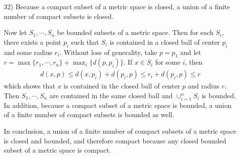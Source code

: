 \documentclass[a4paper,12pt]{article}
\begin{document}
\begin{enumerate}
        \item[32)]
            Because a compact subset of a metric space is closed, a union of a finite number of compact subsets is closed. \par
            Now let $S_1, \cdots, S_n$ be bounded subsets of a metric space. Then for each $S_i$, there exists a point $p_i$ such that $S_i$ is contained in a closed ball of center $p_i$ and some radius $r_i$. Without loss of generality, take $p = p_1$ and let $r = \max\{r_1, \cdots, r_n\} + \max_i\{d(p, p_i)\}$. If $x \in S_i$ for some $i$, then
            \begin{align*}
                d(x, p) \leq d(x, p_i) + d(p_i, p) \leq r_i + d(p_i, p) \leq r
            \end{align*}
            which shows that $x$ is contained in the closed ball of center $p$ and radius $r$. Then $S_1, \cdots, S_n$ are contained in the same closed ball and $\cup_{i = 1}^n S_i$ is bounded. In addition, because a compact subset of a metric space is bounded, a union of a finite number of compact subsets is bounded as well. \par
            In conclusion, a union of a finite number of compact subsets of a metric space is closed and bounded, and therefore compact because any closed bounded subset of a metric space is compact.


\end{enumerate}
\end{document}
